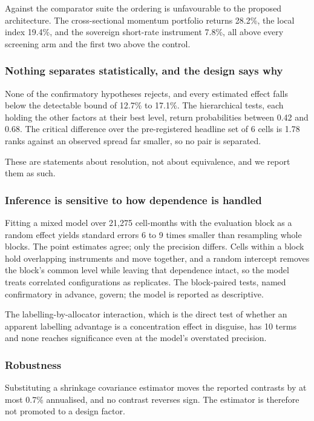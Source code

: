 \documentclass[preprint,11pt,authoryear]{elsarticle}
\begin{document}
Against the comparator suite the ordering is unfavourable to the proposed architecture. The cross-sectional momentum portfolio returns 28.2\%, the local index 19.4\%, and the sovereign short-rate instrument 7.8\%, all above every screening arm and the first two above the control.

\subsubsection{Nothing separates statistically, and the design says why}

None of the confirmatory hypotheses rejects, and every estimated effect falls below the detectable bound of 12.7\% to 17.1\%. The hierarchical tests, each holding the other factors at their best level, return probabilities between 0.42 and 0.68. The critical difference over the pre-registered headline set of 6 cells is 1.78 ranks against an observed spread far smaller, so no pair is separated.

These are statements about resolution, not about equivalence, and we report them as such.

\subsubsection{Inference is sensitive to how dependence is handled}

Fitting a mixed model over 21,275 cell-months with the evaluation block as a random effect yields standard errors 6 to 9 times smaller than resampling whole blocks. The point estimates agree; only the precision differs. Cells within a block hold overlapping instruments and move together, and a random intercept removes the block's common level while leaving that dependence intact, so the model treats correlated configurations as replicates. The block-paired tests, named confirmatory in advance, govern; the model is reported as descriptive.

The labelling-by-allocator interaction, which is the direct test of whether an apparent labelling advantage is a concentration effect in disguise, has 10 terms and none reaches significance even at the model's overstated precision.

\subsubsection{Robustness}

Substituting a shrinkage covariance estimator moves the reported contrasts by at most 0.7\% annualised, and no contrast reverses sign. The estimator is therefore not promoted to a design factor.
\end{document}
